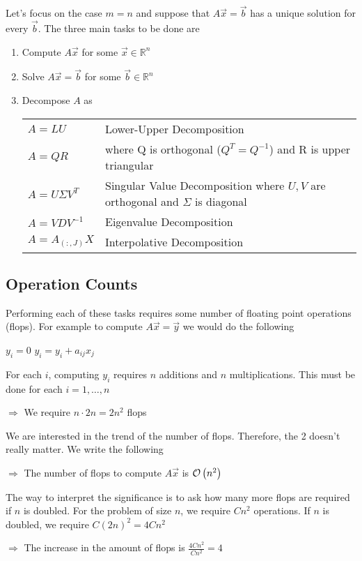\begin{center}
	
\end{center}

Let's focus on the case $m=n$ and suppose that
$A\Vec{x} = \Vec{b}$ has a unique solution for every $\Vec{b}$. 
The three main tasks to be done are 
%
\begin{enumerate}[1)]
    \item Compute $A\Vec{x}$ for some $\Vec{x}\in\mathbb{R}^n$
    \item Solve $A\Vec{x}=\Vec{b}$ for some $\Vec{b}\in\mathbb{R}^n$
    \item Decompose $A$ as 
    
	    \begin{tabular}{lp{6cm}}
         $A=LU$ & Lower-Upper Decomposition  \\
         $A=QR$ & where Q is orthogonal ($Q^T=Q^{-1}$) and R is upper triangular\\
         $A=U\Sigma V^T$ & Singular Value Decomposition 
	 			where $U, V$ are orthogonal and $\Sigma$ is diagonal\\
         $A=VDV^{-1}$ & Eigenvalue Decomposition\\
         $A=A_{(:, J)}X$ & Interpolative Decomposition
    \end{tabular}
\end{enumerate}

\subsection{Operation Counts}
Performing each of these tasks requires some number of floating point operations (flops). 
For example to compute $A\Vec{x} = \Vec{y}$ we would do the following
%
\begin{algorithm}
    \begin{algorithmic} 
            \STATE $y_i = 0$ 
                \STATE $y_i = y_i + a_{ij}x_j$ 
            \ENDFOR
        \ENDFOR
    \end{algorithmic}
\end{algorithm}
%
For each $i$, computing $y_i$ requires $n$ additions and $n$ multiplications. 
This must be done for each $i=1, \ldots, n$
%
\begin{displayquote}
$\Rightarrow$ We require $n \cdot 2n = 2n^2$ flops
\end{displayquote}
%
We are interested in the trend of the number of flops. 
Therefore, the 2 doesn't really matter. 
We write the following
%
\begin{displayquote}
    $\Rightarrow$ The number of flops to compute $A\Vec{x}$ is $\mathcal{O}\left(n^2\right)$
\end{displayquote}
%
The way to interpret the significance is to ask 
how many more flops are required if $n$ is doubled.
For the problem of size $n$, we require $Cn^2$ operations. 
If $n$ is doubled, we require $C(2n)^2=4Cn^2$
%
\begin{displayquote}
$\Rightarrow$ The increase in the amount of flops is $\frac{4Cn^2}{Cn^2} = 4$
\end{displayquote}

